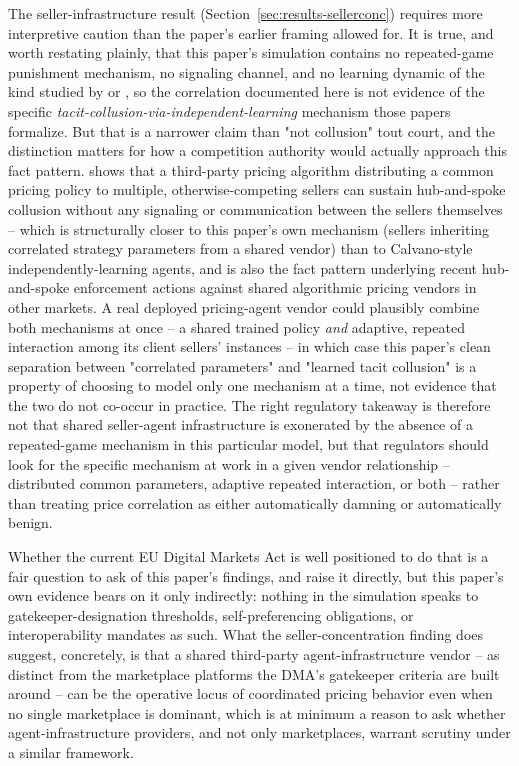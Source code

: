 \documentclass[review]{elsarticle}
\begin{document}
The seller-infrastructure result (Section~\ref{sec:results-sellerconc}) requires more interpretive caution than the paper's earlier framing allowed for. It is true, and worth restating plainly, that this paper's simulation contains no repeated-game punishment mechanism, no signaling channel, and no learning dynamic of the kind studied by \citet{calvano2020artificial} or \citet{klein2021autonomous}, so the correlation documented here is not evidence of the specific \emph{tacit-collusion-via-independent-learning} mechanism those papers formalize. But that is a narrower claim than "not collusion" tout court, and the distinction matters for how a competition authority would actually approach this fact pattern. \citet{harrington2026hubandspoke} shows that a third-party pricing algorithm distributing a common pricing policy to multiple, otherwise-competing sellers can sustain hub-and-spoke collusion without any signaling or communication between the sellers themselves -- which is structurally closer to this paper's own mechanism (sellers inheriting correlated strategy parameters from a shared vendor) than to Calvano-style independently-learning agents, and is also the fact pattern underlying recent hub-and-spoke enforcement actions against shared algorithmic pricing vendors in other markets. A real deployed pricing-agent vendor could plausibly combine both mechanisms at once -- a shared trained policy \emph{and} adaptive, repeated interaction among its client sellers' instances -- in which case this paper's clean separation between "correlated parameters" and "learned tacit collusion" is a property of choosing to model only one mechanism at a time, not evidence that the two do not co-occur in practice. The right regulatory takeaway is therefore not that shared seller-agent infrastructure is exonerated by the absence of a repeated-game mechanism in this particular model, but that regulators should look for the specific mechanism at work in a given vendor relationship -- distributed common parameters, adaptive repeated interaction, or both -- rather than treating price correlation as either automatically damning or automatically benign.

Whether the current EU Digital Markets Act is well positioned to do that is a fair question to ask of this paper's findings, and \citet{bostoen2026futureproof} raise it directly, but this paper's own evidence bears on it only indirectly: nothing in the simulation speaks to gatekeeper-designation thresholds, self-preferencing obligations, or interoperability mandates as such. What the seller-concentration finding does suggest, concretely, is that a shared third-party agent-infrastructure vendor -- as distinct from the marketplace platforms the DMA's gatekeeper criteria are built around -- can be the operative locus of coordinated pricing behavior even when no single marketplace is dominant, which is at minimum a reason to ask whether agent-infrastructure providers, and not only marketplaces, warrant scrutiny under a similar framework.
\end{document}
